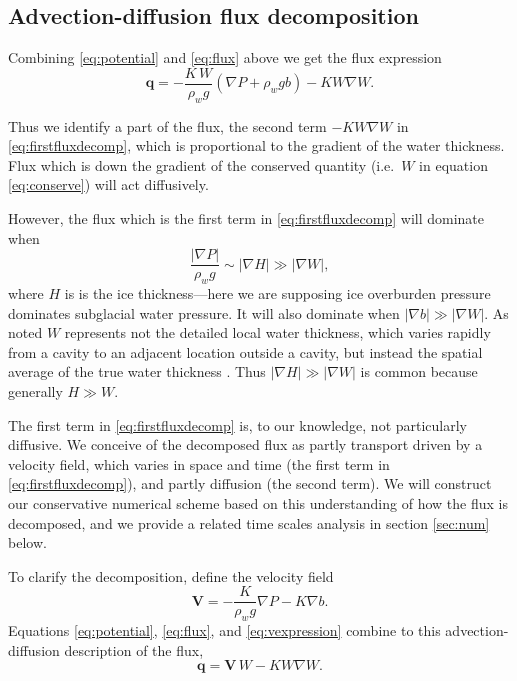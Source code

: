\documentclass[11pt,final]{amsart}%
\newcommand\bV{\mathbf{V}}
\newcommand\bq{\mathbf{q}}
\newcommand{\grad}{\nabla}
\begin{document}
\subsection*{Advection-diffusion flux decomposition}  Combining \eqref{eq:potential} and \eqref{eq:flux} above we get the flux expression
\begin{equation}
  \bq = - \frac{K\, W}{\rho_w g} \left(\grad P + \rho_w g b\right) - K W \grad W. \label{eq:firstfluxdecomp}
\end{equation}

Thus we identify a part of the flux, the second term $-K W \grad W$ in \eqref{eq:firstfluxdecomp}, which is proportional to the gradient of the water thickness.  Flux which is down the gradient of the conserved quantity (i.e.~$W$ in equation \eqref{eq:conserve}) will act diffusively.

However, the flux which is the first term in \eqref{eq:firstfluxdecomp} will dominate when
    $$\frac{|\grad P|}{\rho_w g} \sim |\grad H| \gg |\grad W|,$$
where $H$ is is the ice thickness---here we are supposing ice overburden pressure dominates subglacial water pressure.  It will also dominate when $|\grad b| \gg |\grad W|$.  As noted $W$ represents not the detailed local water thickness, which varies rapidly from a cavity to an adjacent location outside a cavity, but instead the spatial average of the true water thickness \citep{Schoofetal2012}.  Thus $|\grad H| \gg |\grad W|$ is common because generally $H\gg W$.

The first term in \eqref{eq:firstfluxdecomp} is, to our knowledge, not particularly diffusive.  We conceive of the decomposed flux as partly transport driven by a velocity field, which varies in space and time (the first term in \eqref{eq:firstfluxdecomp}), and partly diffusion (the second term).  We will construct our conservative numerical scheme based on this understanding of how the flux is decomposed, and we provide a related time scales analysis in section \ref{sec:num} below.

To clarify the decomposition, define the velocity field
\begin{equation} \label{eq:vexpression}
  \bV = - \frac{K}{\rho_w g} \grad P - K \grad b.
\end{equation}
Equations \eqref{eq:potential}, \eqref{eq:flux}, and \eqref{eq:vexpression} combine to this advection-diffusion description of the flux,
\begin{equation} \label{eq:qexpression}
  \bq = \bV\, W - K W \grad W.
\end{equation}
\end{document}
